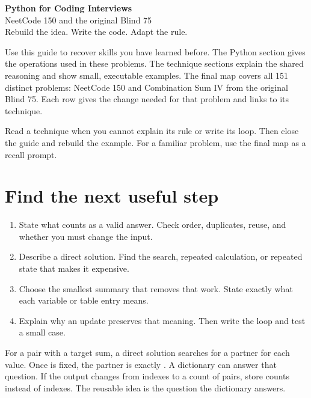 \documentclass[11pt]{article}
\newcommand{\cd}[1]{{\frenchspacing\texttt{\detokenize{#1}}}}
\begin{document}
\begin{center}
{\LARGE\bfseries Python for Coding Interviews}\\[5pt]
{\large NeetCode 150 and the original Blind 75}\\[4pt]
{\small Rebuild the idea. Write the code. Adapt the rule.}
\end{center}
Use this guide to recover skills you have learned before. The Python section gives the operations used in these problems.
The technique sections explain the shared reasoning and show small, executable examples.
The final map covers all 151 distinct problems: NeetCode 150 and Combination Sum IV from the original Blind 75.
Each row gives the change needed for that problem and links to its technique.

Read a technique when you cannot explain its rule or write its loop. Then close the guide and rebuild the example.
For a familiar problem, use the final map as a recall prompt.
\tableofcontents
\newpage

\section{Find the next useful step}\label{sec:reason}
\begin{enumerate}
\item State what counts as a valid answer. Check order, duplicates, reuse, and whether you must change the input.
\item Describe a direct solution. Find the search, repeated calculation, or repeated state that makes it expensive.
\item Choose the smallest summary that removes that work. State exactly what each variable or table entry means.
\item Explain why an update preserves that meaning. Then write the loop and test a small case.
\end{enumerate}
For a pair with a target sum, a direct solution searches for a partner for each value.
Once \cd{x} is fixed, the partner is exactly \cd{target - x}. A dictionary can answer that question.
If the output changes from indexes to a count of pairs, store counts instead of indexes.
The reusable idea is the question the dictionary answers.
\end{document}
